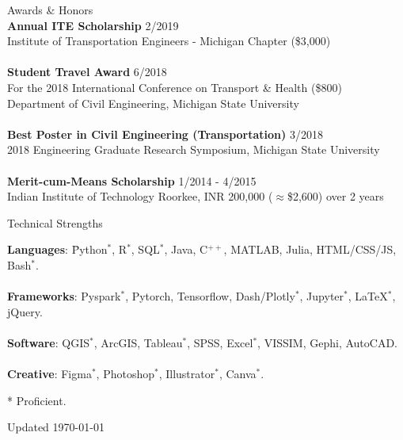 \documentclass{CV} %
\begin{document}
\begin{rSection}{Awards \& Honors}
    \\ \textbf{Annual ITE Scholarship} \hfill {2/2019}
    \\ Institute of Transportation Engineers - Michigan Chapter (\$3,000) \\
    \\ \textbf{Student Travel Award} \hfill {6/2018}
    \\ For the 2018 International Conference on Transport \& Health (\$800)
    \\ Department of Civil Engineering, Michigan State University \\
    \\ \textbf{Best Poster in Civil Engineering (Transportation)} \hfill{3/2018}
    \\ 2018 Engineering Graduate Research Symposium, Michigan State University \\
    \\ \textbf{Merit-cum-Means Scholarship} \hfill{1/2014 - 4/2015}
    \\ Indian Institute of Technology Roorkee, INR 200,000 ($\approx$\$2,600) over 2 years
\end{rSection}

\newpage
\begin{rSection}{Technical Strengths}
    \begin{tabbing}
    \textbf{Languages}: \hspace*{0.5cm} \= Python$^*$, R$^*$, SQL$^*$, Java, C$^{++}$, MATLAB, Julia, HTML/CSS/JS, Bash$^*$. \\
    \\ \textbf{Frameworks}: \> Pyspark$^*$, Pytorch, Tensorflow, Dash/Plotly$^*$, Jupyter$^*$, LaTeX$^*$, jQuery. \\
    \\ \textbf{Software}: \> QGIS$^*$, ArcGIS, Tableau$^*$, SPSS, Excel$^*$, VISSIM, Gephi, AutoCAD. \\
    \\ \textbf{Creative}: \> Figma$^*$, Photoshop$^*$, Illustrator$^*$, Canva$^*$.
    \end{tabbing}
    * Proficient.
\end{rSection}

\vspace*{\fill}
\centering Updated \today
\end{document}
